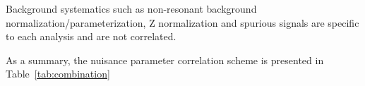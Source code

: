 Background systematics such as non-resonant background normalization/parameterization, Z normalization and spurious signals are specific to each analysis and are not correlated.  

As a summary, the nuisance parameter correlation scheme is presented in Table~\ref{tab:combination}



